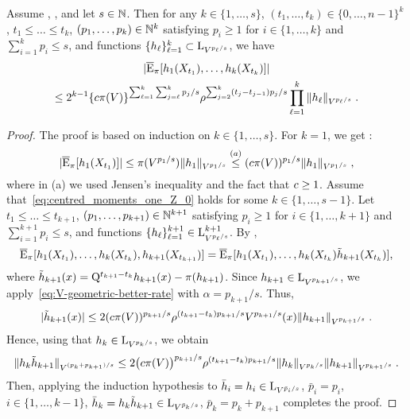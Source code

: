 \begin{lemma}
\label{lem:centered_moments_Z_old}
Assume , , and let $s \in \mathbb{N}$. Then for any $k \in \{1,\ldots,s\}$,  $(t_1,\dots,t_{k}) \in \{0,\ldots,n-1\}^{k}$, $t_1 \leq \dots\leq t_{k}$,   $(p_1,\dots,p_k) \in \mathbb{N}^k$ satisfying  $p_i \geq 1$ for $i \in \{1,\dots,k\}$ and $\sum_{i=1}^k p_i \le s$, and functions $\{h_{\ell}\}_{\ell=1}^{k} \subset  \mathrm{L}_{V^{p_\ell/s}}$, we have 
\begin{multline}
\label{eq:centred_moments_one_Z_0}
  |\overline{\mathrm{E}}_\pi[h_1(X_{t_1}), \ldots, h_k(X_{t_k})] |
   \\\leq 2^{k-1} \{c \pi(V)\}^{\sum_{\ell=1}^k\sum_{j=\ell}^k p_{j}/s} \rho^{\sum_{j=2}^{k}(t_j - t_{j-1})p_{j}/s} \prod_{\ell = 1}^k   \|h_\ell\|_{V^{p_{\ell}/s}} \;.
\end{multline}
\end{lemma}
\begin{proof}
 The proof is based on induction on $k \in \{1,\dots,s\}$.  For $k = 1$, we get :
\begin{equation*}
|\overline{\mathrm{E}}_\pi[h_1(X_{t_1})]| \leq \pi(V^{p_1/s}) \|h_1\|_{V^{p_{1}/s}} \overset{(a)}{\leq} (c \pi(V))^{p_{1}/s} \|h_1\|_{V^{p_{1}/s}}\;,
\end{equation*}
where in (a) we used Jensen's inequality and the fact that $c \geq 1$.
Assume that~\eqref{eq:centred_moments_one_Z_0} holds for some $k \in \{1,\dots,s-1\}$. Let $t_1 \leq \dots\leq t_{k+1}$,   $(p_1,\dots,p_{k+1})\in \mathbb{N}^{k+1}$ satisfying  $p_i \geq 1$ for $i \in \{1,\dots,k+1\}$ and $\sum_{i=1}^{k+1} p_i \le s$, and functions $\{h_{\ell}\}_{\ell=1}^{k+1} \in  \mathrm{L}_{V^{p_\ell/s}}^{k+1}$. By ,
\begin{equation*}
   \overline{\mathrm{E}}_\pi[h_1(X_{t_1}), \ldots, h_k(X_{t_k}), h_{k+1}(X_{t_{k+1}})] = \overline{\mathrm{E}}_\pi[h_1(X_{t_1}), \ldots , h_k(X_{t_k}) \tilde h_{k+1}(X_{t_k})],
  \end{equation*}
  where $\tilde h_{k+1}(x) = {\rm Q}^{t_{k+1} - t_k} h_{k+1}(x) - \pi(h_{k+1})$.
  Since $h_{k+1} \in \mathrm{L}_{V^{p_{k+1}/s}}$, we apply~\eqref{eq:V-geometric-better-rate} with $\alpha = p_{k+1}/ s$. Thus,
  $$
  |\tilde h_{k+1}(x)| \leq 2(c \pi(V))^{p_{k+1}/s} \rho^{(t_{k+1} - t_k)p_{k+1}/s} V^{p_{k+1}/s}(x) \|h_{k+1}\|_{V^{p_{k+1}/s}}\;.
  $$
  Hence, using that $h_{k} \in \mathrm{L}_{V^{p_{k}/s}}$, we obtain
\begin{equation*}
\|h_k \tilde h_{k+1}\|_{V^{(p_k+p_{k+1})/s}}  \leq
 2 \bigl(c \pi(V)\bigr)^{p_{k+1}/s}\rho^{(t_{k+1} - t_k)p_{k+1}/s}
 \|h_{k}\|_{V^{p_{k}/s}}
 \|h_{k+1}\|_{V^{p_{k+1}/s}} \;.
\end{equation*}
Then, applying the induction hypothesis to $\bar{h}_i = h_i \in \mathrm{L}_{V^{\bar{p}_i/s}}$, $\bar{p}_i = p_i$, $i \in\{1,\ldots,k-1\}$, $\bar{h}_k = h_k \tilde h_{k+1} \in \mathrm{L}_{V^{\bar{p}_k/s}}$, $\bar{p}_k = p_k + p_{k+1}$ completes the proof.
\end{proof}
